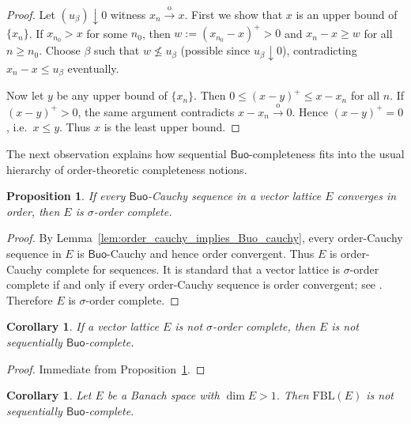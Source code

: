 \documentclass[11pt]{amsart}
\newtheorem{proposition}[theorem]{Proposition}
\newtheorem{corollary}[theorem]{Corollary}
\theoremstyle{definition}
\newcommand{\Buo}{\ensuremath{\mathsf{Buo}}}
\renewcommand{\le}{\leqslant}
\renewcommand{\ge}{\geqslant}
\begin{document}
\begin{proof}
Let $(u_\beta)\downarrow 0$ witness $x_n\xrightarrow{\mathrm{o}}x$.
First we show that $x$ is an upper bound of $\{x_n\}$.
If $x_{n_0}>x$ for some $n_0$, then $w:=(x_{n_0}-x)^+>0$ and $x_n-x\ge w$ for all $n\ge n_0$.
Choose $\beta$ such that $w\not\le u_\beta$ (possible since $u_\beta\downarrow 0$), contradicting
$x_n-x\le u_\beta$ eventually.

Now let $y$ be any upper bound of $\{x_n\}$. Then $0\le (x-y)^+\le x-x_n$ for all $n$.
If $(x-y)^+>0$, the same argument contradicts $x-x_n\xrightarrow{\mathrm{o}}0$.
Hence $(x-y)^+=0$, i.e.\ $x\le y$. Thus $x$ is the least upper bound.
\end{proof}

The next observation explains how sequential \Buo-completeness fits into the
usual hierarchy of order-theoretic completeness notions.

\begin{proposition}\label{prop:Buo_complete_implies_sigma_order_complete}
If every \Buo-Cauchy sequence in a vector lattice $E$ converges in order, then
$E$ is $\sigma$-order complete.
\end{proposition}

\begin{proof}
By Lemma~\ref{lem:order_cauchy_implies_Buo_cauchy}, every order-Cauchy
sequence in $E$ is \Buo-Cauchy and hence order convergent. Thus $E$ is
order-Cauchy complete for sequences. It is standard that a vector lattice is
$\sigma$-order complete if and only if every order-Cauchy sequence is order
convergent; see \cite[Proposition~18.46 and Remark~18.47]{TaylorThesis2018}.
Therefore $E$ is $\sigma$-order complete.
\end{proof}

\begin{corollary}\label{cor:non_sigma_order_complete_not_Buo_complete}
If a vector lattice $E$ is not $\sigma$-order complete, then $E$ is not
sequentially \Buo-complete.
\end{corollary}

\begin{proof}
Immediate from Proposition~\ref{prop:Buo_complete_implies_sigma_order_complete}.
\end{proof}

\begin{corollary}\label{cor:FBL_not_Buo_complete}
Let $E$ be a Banach space with $\dim E>1$. Then $\mathrm{FBL}(E)$ is not
sequentially \Buo-complete.
\end{corollary}
\end{document}
